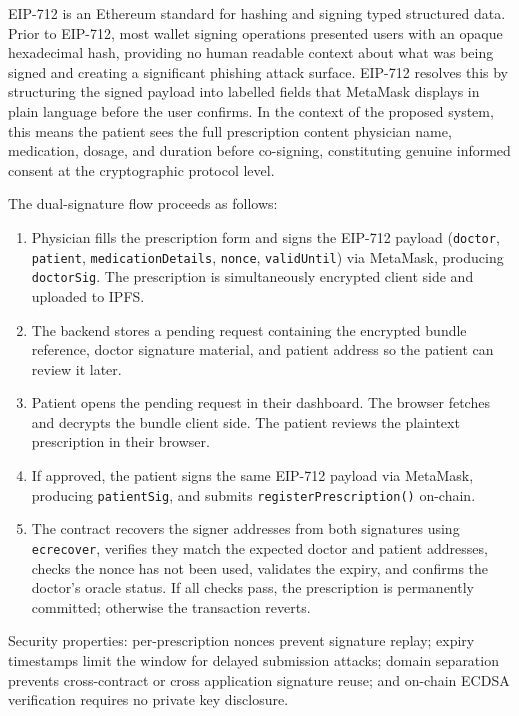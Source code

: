 \documentclass[12pt,a4wide]{report}
\begin{document}
EIP-712 is an Ethereum standard for hashing and signing typed structured data.
Prior to EIP-712, most wallet signing operations presented users with an opaque
hexadecimal hash, providing no human readable context about what was being signed
and creating a significant phishing attack surface. EIP-712 resolves this by
structuring the signed payload into labelled fields that MetaMask displays in
plain language before the user confirms. In the context of the proposed system, this means the
patient sees the full prescription content physician name, medication, dosage,
and duration before co-signing, constituting genuine informed consent at the
cryptographic protocol level.

The dual-signature flow proceeds as follows:

\begin{enumerate}
  \item Physician fills the prescription form and signs the EIP-712 payload
    (\texttt{doctor}, \texttt{patient}, \texttt{medicationDetails}, \texttt{nonce},
    \texttt{validUntil}) via MetaMask, producing \texttt{doctorSig}. The prescription
    is simultaneously encrypted client side and uploaded to IPFS.
  \item The backend stores a pending request containing the encrypted bundle
    reference, doctor signature material, and patient address so the patient can
    review it later.
  \item Patient opens the pending request in their dashboard. The browser fetches
    and decrypts the bundle client side. The patient reviews the plaintext
    prescription in their browser.
  \item If approved, the patient signs the same EIP-712 payload via MetaMask,
    producing \texttt{patientSig}, and submits \texttt{registerPrescription()} on-chain.
  \item The contract recovers the signer addresses from both signatures using
    \texttt{ecrecover}, verifies they match the expected doctor and patient
    addresses, checks the nonce has not been used, validates the expiry, and
    confirms the doctor's oracle status. If all checks pass, the prescription is
    permanently committed; otherwise the transaction reverts.
\end{enumerate}

Security properties: per-prescription nonces prevent signature replay; expiry
timestamps limit the window for delayed submission attacks; domain separation
prevents cross-contract or cross application signature reuse; and on-chain ECDSA
verification requires no private key disclosure.
\end{document}

